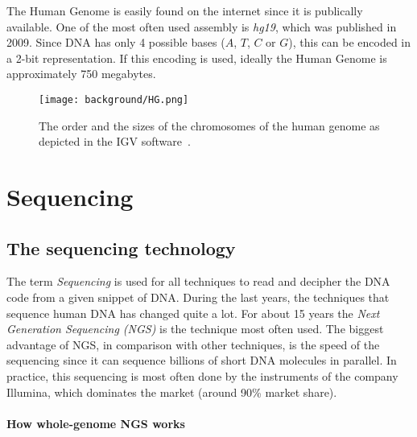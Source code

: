 The Human Genome is easily found on the internet since it is publically available. One of the most often used assembly is \emph{hg19}, which was published in 2009. Since DNA has only 4 possible bases ($A$, $T$, $C$ or $G$), this can be encoded in a 2-bit representation. If this encoding is used, ideally the Human Genome is approximately 750 megabytes.

\begin{figure}[H]
	\centering
	\texttt{[image: background/HG.png]}
	\caption{The order and the sizes of the chromosomes of the human genome as depicted in the IGV software~\cite{IGV}.}
	\label{fig:HG}
\end{figure}

\section{Sequencing}

\subsection{The sequencing technology}

The term \emph{Sequencing} is used for all techniques to read and decipher the DNA code from a given snippet of DNA. During the last years, the techniques that sequence human DNA has changed quite a lot. For about 15 years the \emph{Next Generation Sequencing (NGS)} is the technique most often used. The biggest advantage of NGS, in comparison with other techniques, is the speed of the sequencing since it can sequence billions of short DNA molecules in parallel. In practice, this sequencing is most often done by the instruments of the company Illumina, which dominates the market (around 90\% market share).

\paragraph{How whole-genome NGS works}

